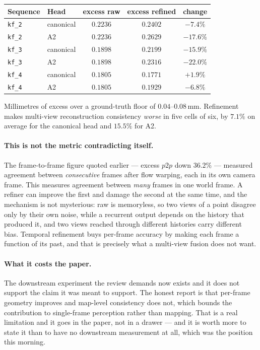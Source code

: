 \documentclass[11pt,a4paper]{article}
\begin{document}
\begin{center}
\begin{tabular}{llccc}
\toprule
Sequence & Head & excess raw & excess refined & change \\
\midrule
\texttt{kf\_2} & canonical & $0.2236$ & $0.2402$ & $-7.4\%$ \\
\texttt{kf\_2} & A2        & $0.2236$ & $0.2629$ & $-17.6\%$ \\
\texttt{kf\_3} & canonical & $0.1898$ & $0.2199$ & $-15.9\%$ \\
\texttt{kf\_3} & A2        & $0.1898$ & $0.2316$ & $-22.0\%$ \\
\texttt{kf\_4} & canonical & $0.1805$ & $0.1771$ & $+1.9\%$ \\
\texttt{kf\_4} & A2        & $0.1805$ & $0.1929$ & $-6.8\%$ \\
\bottomrule
\end{tabular}
\end{center}

Millimetres of excess over a ground-truth floor of $0.04$--$0.08$\,mm. Refinement
makes multi-view reconstruction consistency \emph{worse} in five cells of six,
by $7.1\%$ on average for the canonical head and $15.5\%$ for A2.

\paragraph{This is not the metric contradicting itself.} The frame-to-frame
figure quoted earlier --- excess $p2p$ down $36.2\%$ --- measured agreement
between \emph{consecutive} frames after flow warping, each in its own camera
frame. This measures agreement between \emph{many} frames in one world frame. A
refiner can improve the first and damage the second at the same time, and the
mechanism is not mysterious: raw is memoryless, so two views of a point disagree
only by their own noise, while a recurrent output depends on the history that
produced it, and two views reached through different histories carry different
bias. Temporal refinement buys per-frame accuracy by making each frame a
function of its past, and that is precisely what a multi-view fusion does not
want.

\paragraph{What it costs the paper.} The downstream experiment the review demands
now exists and it does not support the claim it was meant to support. The honest
report is that per-frame geometry improves and map-level consistency does not,
which bounds the contribution to single-frame perception rather than mapping.
That is a real limitation and it goes in the paper, not in a drawer --- and it is
worth more to state it than to have no downstream measurement at all, which was
the position this morning.
\end{document}
